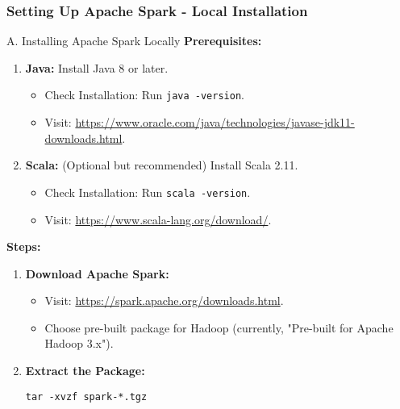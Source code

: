 \documentclass[aspectratio=169]{beamer}
\begin{document}
\begin{frame}[fragile]
    \frametitle{Setting Up Apache Spark - Local Installation}
    \begin{block}{A. Installing Apache Spark Locally}
        \textbf{Prerequisites:}
        \begin{enumerate}
            \item \textbf{Java:} Install Java 8 or later.
                \begin{itemize}
                    \item Check Installation: Run \texttt{java -version}.
                    \item Visit: \url{https://www.oracle.com/java/technologies/javase-jdk11-downloads.html}.
                \end{itemize}
            \item \textbf{Scala:} (Optional but recommended) Install Scala 2.11.
                \begin{itemize}
                    \item Check Installation: Run \texttt{scala -version}.
                    \item Visit: \url{https://www.scala-lang.org/download/}.
                \end{itemize}
        \end{enumerate}

        \textbf{Steps:}
        \begin{enumerate}
            \item \textbf{Download Apache Spark:}
                \begin{itemize}
                    \item Visit: \url{https://spark.apache.org/downloads.html}.
                    \item Choose pre-built package for Hadoop (currently, "Pre-built for Apache Hadoop 3.x").
                \end{itemize}
            \item \textbf{Extract the Package:}
            \begin{lstlisting}
tar -xvzf spark-*.tgz
            \end{lstlisting}
        \end{enumerate}
    \end{block}
\end{frame}
\end{document}
